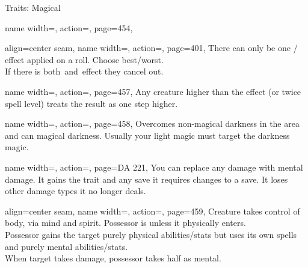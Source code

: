 \begin{PageFront}
\begin{Tables}{\frontTableHeight}
\begin{Table}{Traits: Magical}
\begin{entry}{}{%
                name width=\conditionLength,%
                action=\Death,
                page=454,
            }
            \end{entry}
            \begin{entry}{}{%
                align=center seam,
                name width=\conditionLength,%
                action=\stackbox[l][c]{\Fortune\\\vspace{-0.6ex}\Misfortune},
                page=401,
            }
                There can only be one \Fortune/\Misfortune\,effect applied on a roll.
                Choose best/worst.\\
                If there is both \Fortune\,and \Misfortune\,effect they cancel out.
            \end{entry}
            \begin{entry}{}{%
                name width=\conditionLength,%
                action=\Incapacitation,
                page=457,
            }
                Any creature higher than the effect (or twice spell level) treats the result as one step higher.
            \end{entry}
            \begin{entry}{}{%
                name width=\conditionLength,%
                action=\Light,
                page=458,
            }
                Overcomes non-magical darkness in the area and can  magical darkness.
                Usually your light magic must target the darkness magic.
            \end{entry}
            \begin{entry}{}{%
                name width=\conditionLength,%
                action=\Mindshift,
                page=DA 221,
            }
                You can replace any damage with mental damage.
                It gains the \Mental trait and any save it requires changes to a \WillT save.
                It loses other damage types it no longer deals.
            \end{entry}
            \begin{entry}{}{%
                align=center seam,
                name width=\conditionLength,%
                action=\Possession,
                page=459,
            }
                Creature takes control of body, via mind and spirit. Possessor is \Unconscious unless it physically enters.\\
                Possessor gains the target purely physical abilities/stats but uses its own spells and purely mental abilities/stats.\\
                When target takes damage, possessor takes half as mental. \hfill

\end{entry}
\end{Table}
\end{Tables}
\end{PageFront}
